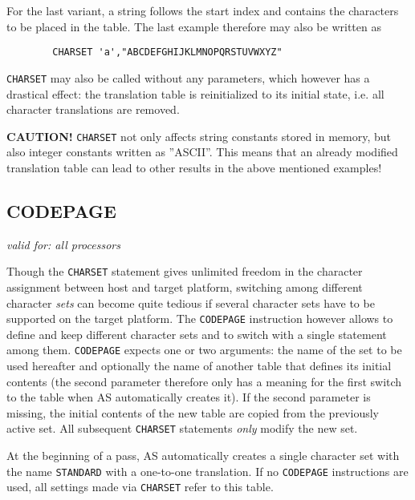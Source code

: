 \documentclass[12pt,twoside]{report}
\makeatletter
\newcommand{\bb}[1]{{\bf #1}}
\newcommand{\tty}[1]{{\tt #1}}
\newcommand{\ttindex}[1]{\index{#1@{\tt #1}}}
\makeatother
\begin{document}
For the last variant, a string follows the start index and contains the
characters to be placed in the table.  The last example therefore may also
be written as
\begin{verbatim}
        CHARSET 'a',"ABCDEFGHIJKLMNOPQRSTUVWXYZ"
\end{verbatim}

\tty{CHARSET} may also be called without any parameters, which however has
a drastical effect: the translation table is reinitialized to its initial
state, i.e. all character translations are removed.

\bb{CAUTION!} \tty{CHARSET} not only affects string constants stored in
memory, but also integer constants written as ''ASCII''. This means that
an already modified translation table can lead to other results in the
above mentioned examples!


\subsection{CODEPAGE}
\ttindex{CODEPAGE}   

{\em valid for: all processors}

Though the \tty{CHARSET} statement gives unlimited freedom in the
character assignment between host and target platform, switching among
different character {\em sets} can become quite tedious if several
character sets have to be supported on the target platform.  The
\tty{CODEPAGE} instruction however allows to define and keep different
character sets and to switch with a single statement among them. 
\tty{CODEPAGE} expects one or two arguments: the name of the set to be
used hereafter and optionally the name of another table that defines its
initial contents (the second parameter therefore only has a meaning for
the first switch to the table when AS automatically creates it).  If the
second parameter is missing, the initial contents of the new table are
copied from the previously active set.  All subsequent \tty{CHARSET}
statements {\em only} modify the new set.

At the beginning of a pass, AS automatically creates a single character
set with the name \tty{STANDARD} with a one-to-one translation.  If no
\tty{CODEPAGE} instructions are used, all settings made via \tty{CHARSET}
refer to this table.

\end{document}
